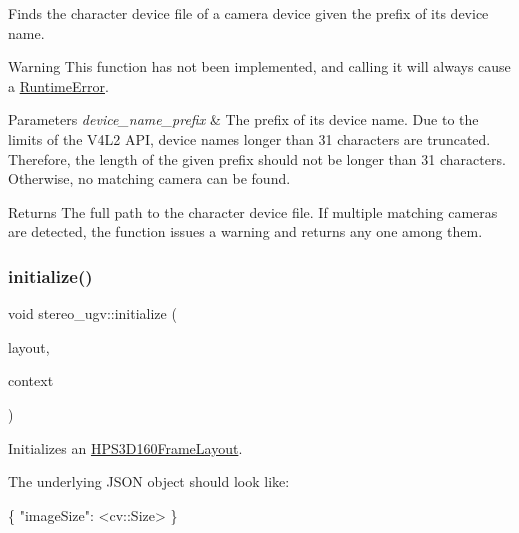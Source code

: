 Finds the character device file of a camera device given the prefix of its device name. 

\begin{DoxyWarning}{Warning}
This function has not been implemented, and calling it will always cause a \hyperlink{classstereo__ugv_1_1RuntimeError}{Runtime\+Error}. 
\end{DoxyWarning}

\begin{DoxyParams}{Parameters}
{\em device\+\_\+name\+\_\+prefix} & The prefix of its device name. Due to the limits of the V4\+L2 A\+PI, device names longer than 31 characters are truncated. Therefore, the length of the given prefix should not be longer than 31 characters. Otherwise, no matching camera can be found. \\
\hline
\end{DoxyParams}
\begin{DoxyReturn}{Returns}
The full path to the character device file. If multiple matching cameras are detected, the function issues a warning and returns any one among them. 
\end{DoxyReturn}
\mbox{\label{namespacestereo__ugv_ac02cc03581ba53b911a9a7bd87f9a24c}} 
\subsubsection{\texorpdfstring{initialize()}{initialize()}\hspace{0.1cm}{\footnotesize\ttfamily [1/8]}}
{\footnotesize\ttfamily void stereo\+\_\+ugv\+::initialize (\begin{DoxyParamCaption}\item[{\hyperlink{classstereo__ugv_1_1HPS3D160FrameLayout}{H\+P\+S3\+D160\+Frame\+Layout} $\ast$}]{layout,  }\item[{const \hyperlink{classstereo__ugv_1_1Context}{Context} \&}]{context }\end{DoxyParamCaption})}



Initializes an \hyperlink{classstereo__ugv_1_1HPS3D160FrameLayout}{H\+P\+S3\+D160\+Frame\+Layout}. 

The underlying J\+S\+ON object should look like\+: 
\begin{DoxyCode}
\{
  \textcolor{stringliteral}{"imageSize"}: <cv::Size>
\}
\end{DoxyCode}
 
